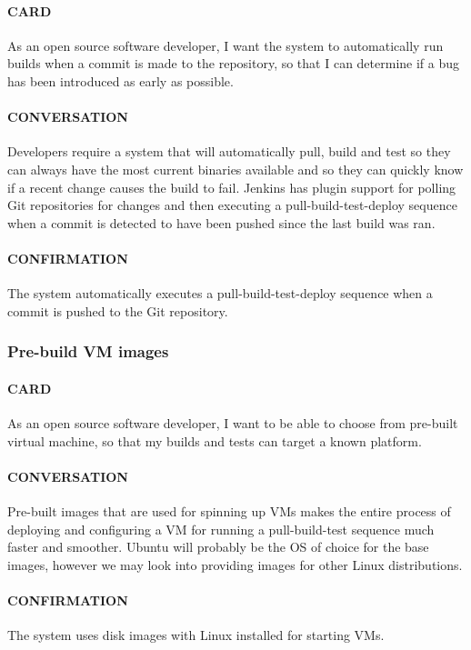 \documentclass[10pt,letterpaper,onecolumn,draftclsnofoot]{IEEEtran}
\begin{document}
\paragraph{CARD}
As an open source software developer, I want the system to automatically run builds when a commit is made to the repository, so that I can determine if a bug has been introduced as early as possible.
\paragraph{CONVERSATION}
Developers require a system that will automatically pull, build and test so they can always have the most current
binaries available and so they can quickly know if a recent change causes the build to fail. Jenkins has plugin support for polling
Git repositories for changes and then executing a pull-build-test-deploy sequence when a commit is detected to have been pushed since
the last build was ran.
\paragraph{CONFIRMATION}
The system automatically executes a pull-build-test-deploy sequence when a commit is pushed to the Git repository.

\subsubsection{Pre-build VM images}
\paragraph{CARD}
As an open source software developer, I want to be able to choose from pre-built virtual machine, so that my builds and tests can target a known platform. 
\paragraph{CONVERSATION}
Pre-built images that are used for spinning up VMs makes the entire process of deploying and configuring a VM
for running a pull-build-test sequence much faster and smoother. Ubuntu will probably be the OS of choice for the base images, however
we may look into providing images for other Linux distributions.
\paragraph{CONFIRMATION}
The system uses disk images with Linux installed for starting VMs.
\end{document}
